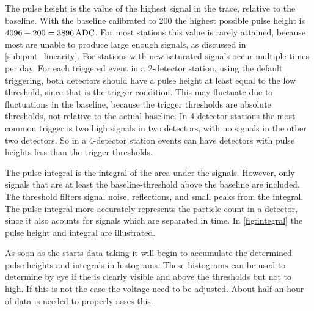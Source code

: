 The pulse height is the value of the highest signal in the trace, relative to the baseline. With the baseline calibrated to \SI{200}{\adc} the highest possible pulse height is $4096 - 200 = \SI{3896}{\adc}$. For most stations this value is rarely attained, because most \pmts are unable to produce large enough signals, as discussed in \cref{sub:pmt_linearity}. For stations with new \pmts saturated signals occur multiple times per day. For each triggered event in a 2-detector station, using the default triggering, both detectors should have a pulse height at least equal to the low threshold, since that is the trigger condition. This may fluctuate due to fluctuations in the baseline, because the trigger thresholds are absolute thresholds, not relative to the actual baseline. In 4-detector stations the most common trigger is two high signals in two detectors, with no signals in the other two detectors. So in a 4-detector station events can have detectors with pulse heights less than the trigger thresholds.

The pulse integral is the integral of the area under the signals. However, only signals that are at least the baseline-threshold above the baseline are included. The threshold filters signal noise, reflections, and small peaks from the integral. The pulse integral more accurately represents the particle count in a detector, since it also acounts for signals which are separated in time. In \cref{fig:integral} the pulse height and integral are illustrated.

As soon as the \hisparc \daq starts data taking it will begin to accumulate the determined pulse heights and integrals in histograms. These histograms can be used to determine by eye if the \mpv is clearly visible and above the thresholds but not to high. If this is not the case the \pmts voltage need to be adjusted. About half an hour of data is needed to properly asses this.

